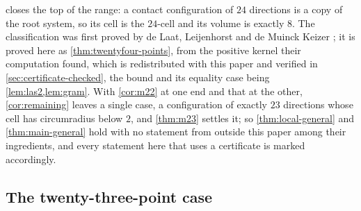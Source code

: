 \documentclass[11pt,reqno]{amsart}
\renewcommand{\_}{\origunderscore\allowbreak}
\numberwithin{equation}{section}
\theoremstyle{plain}
\theoremstyle{definition}
\theoremstyle{remark}
\begin{document}
 closes the top of the range: a contact configuration of
$24$ directions is a copy of the root system, so its cell is the
$24$-cell and its volume is exactly $8$. The classification was first
proved by de Laat, Leijenhorst and de Muinck Keizer \cite{LLM24}; it is
proved here as \cref{thm:twentyfour-points}, from the positive kernel
their computation found, which is redistributed with this paper and
verified in \cref{sec:certificate-checked}, the bound and its equality
case being \cref{lem:las2,lem:gram}. With \cref{cor:m22} at one end and
that at the other, \cref{cor:remaining} leaves a single case, a
configuration of exactly $23$ directions whose cell has circumradius
below $2$, and \cref{thm:m23} settles it; so \cref{thm:local-general}
and \cref{thm:main-general} hold with no statement from outside this
paper among their ingredients, and every statement here that uses a
certificate is marked accordingly.

\subsection{The twenty-three-point case}
\end{document}
